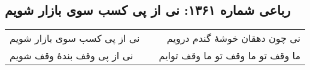 \begin{center}
\section*{رباعی شماره ۱۳۶۱: نی از پی کسب سوی بازار شویم}
\label{sec:1361}
\begin{longtable}{l p{0.5cm} r}
نی از پی کسب سوی بازار شویم
&&
نی چون دهقان خوشهٔ گندم درویم
\\
نی از پی وقف بندهٔ وقف شویم
&&
ما وقف تو ما وقف تو ما وقف توایم
\\
\end{longtable}
\end{center}
